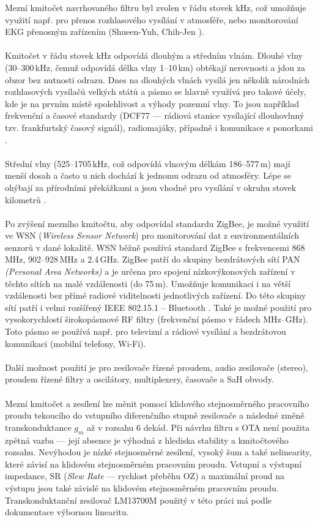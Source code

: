 Mezní kmitočet navrhovaného filtru byl zvolen v řádu stovek kHz, což umožňuje využití např. pro přenos rozhlasového vysílání v atmosféře, nebo monitorování EKG přenosným zařízením (Shueen-Yuh, Chih-Jen \cite{1}). \\ 
\\
Kmitočet v řádu stovek kHz odpovídá dlouhým a středním vlnám. Dlouhé vlny (30--300\,kHz, čemuž odpovídá délka vlny 1--10\,km) obtékají nerovnosti a jdou za obzor bez nutnosti odrazu. Dnes na dlouhých vlnách vysílá jen několik národních rozhlasových vysílačů velkých států a pásmo se hlavně využívá pro takové účely, kde je na prvním místě spolehlivost a výhody pozemní vlny. To jsou například frekvenční a časové standardy (DCF77 --- rádiová stanice vysílající dlouhovlnný tzv. frankfurtský časový signál), radiomajáky, případně i komunikace s ponorkami \cite{2}. \\
\\
Střední vlny (525--1705\,kHz, což odpovídá vlnovým délkám 186--577\,m) mají menší dosah a často u nich dochází k jednomu odrazu od atmosféry. Lépe se ohýbají za přírodními překážkami a jsou vhodné pro vysílání v okruhu stovek kilometrů \cite{3}. \\
\\
Po zvýšení mezního kmitočtu, aby odpovídal standardu ZigBee, je možné využití ve WSN (\textit{Wireless Sensor Network}) pro monitorování dat z environmentálních senzorů v dané lokalitě. WSN běžně používá standard ZigBee s frekvencemi 868\,MHz, 902–928\,MHz a 2.4\,GHz. ZigBee patří do skupiny bezdrátových sítí PAN \textit{(Personal Area Networks)} a je určena pro spojení nízkovýkonových zařízení v těchto sítích na malé vzdálenosti (do 75\,m). Umožňuje komunikaci i na větší vzdálenosti bez přímé radiové viditelnosti jednotlivých zařízení. Do této skupiny sítí patří i velmi rozšířený IEEE 802.15.1 – Bluetooth \cite{4}. Také je možné použití pro vysokorychlostí širokopásmové RF filtry (frekvenční pásmo v řádech MHz--GHz). Toto pásmo se používá např. pro televizní a rádiové vysílání a bezdrátovou komunikaci (mobilní telefony, Wi-Fi). \\
\\
Další možnost použití je pro zesilovače řízené proudem, audio zesilovače (stereo), proudem řízené filtry a oscilátory, multiplexery, časovače a SaH obvody.\\
\\
Mezní kmitočet a zesílení lze měnit pomocí klidového stejnosměrného pracovního proudu tekoucího do vstupního diferenčního stupně zesilovače a následné změně transkonduktance $g_m$ až v rozsahu 6 dekád. Při návrhu filtru s OTA není použita zpětná vazba --- její absence je výhodná z hlediska stability a kmitočtového rozsahu. Nevýhodou je nízké stejnosměrné zesílení, vysoký šum a také nelinearity, které závisí na klidovém stejnosměrném pracovním proudu. Vstupní a výstupní impedance, SR (\textit{Slew Rate} --- rychlost přeběhu OZ) a maximální proud na výstupu jsou také závislé na klidovém stejnosměrném pracovním proudu. Transkonduktanční zesilovač LM13700M použitý v této práci má podle dokumentace výbornou linearitu.
